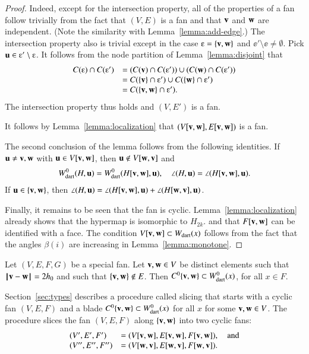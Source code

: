 \begin{proof} 
 Indeed, except for the intersection property, all of the properties of a fan follow trivially from the fact that $(V,E)$ is a fan and
that ${\mathbf v}$ and ${\mathbf w}$ are independent.  (Note the similarity with Lemma~\ref{lemma:add-edge}.)
The intersection property also is trivial except in the case $\ee=\{\v,\w\}$ and $\ee'\setminus \ee\ne \emptyset$.  Pick $\u\in \ee'\setminus\ee$.  It follows from the node
partition of Lemma~\ref{lemma:disjoint} that
$$
\begin{array}{lll}
C(\ee) \cap C(\ee') &= (C(\v) \cap C(\ee')) \cup (C(\w)\cap C(\ee')) \\
 &= C(\{\v\}\cap \ee') \cup C(\{\w\}\cap \ee') \\
 &= C(\{\v,\w\}\cap \ee').
\end{array}
$$
The intersection property thus holds and $(V,E')$ is a fan.

It follows by Lemma~\ref{lemma:localization} that $(V[{\mathbf v},{\mathbf w}],E[{\mathbf v},{\mathbf w}])$ is a fan.

The second conclusion of the lemma follows from the following identities.
If ${\mathbf u}\ne {\mathbf v},{\mathbf w}$ with ${\mathbf u}\in V[{\mathbf v},{\mathbf w}]$, then ${\mathbf u}\not\in V[{\mathbf w},{\mathbf v}]$ and 
\begin{equation}
W^0_{\text{dart}}(H,{\mathbf u})=W^0_{\text{dart}}(H[{\mathbf v},{\mathbf w}],{\mathbf u}),\quad \angle(H,{\mathbf u}) = \angle(H[{\mathbf v},{\mathbf w}],{\mathbf u}).
\end{equation}
If ${\mathbf u}\in\{{\mathbf v},{\mathbf w}\}$, then 
$\angle(H,{\mathbf u})=\angle(H[{\mathbf v},{\mathbf w}],{\mathbf u}) +\angle(H[{\mathbf w},{\mathbf v}],{\mathbf u})$.

Finally, it remains to be seen that the fan is cyclic.  Lemma~\ref{lemma:localization} already shows that the hypermap is isomorphic to $H_{2k}$. and that $F[{\mathbf v},{\mathbf w}]$ can be identified with a face.  The condition $V[{\mathbf v},{\mathbf w}]\subset W_{\text{dart}}(x)$ follows from the fact that the angles $\beta(i)$ are increasing in Lemma~\ref{lemma:monotone}.
\end{proof}


\begin{lemma}\label{lemma:2hm-slice}
Let $(V,E,F,G)$ be a special fan.  Let ${\mathbf v},{\mathbf w}\in V$ be distinct elements such that ${\hskip0.1em|\hskip-0.15em|\hskip0.1em}{\mathbf v} - {\mathbf w}{\hskip0.1em|\hskip-0.15em|\hskip0.1em}=2{h_0}$ and such that $\{{\mathbf v},{\mathbf w}\}\not\in E$.
Then $C^0\{{\mathbf v},{\mathbf w}\}\subset W^0_{\text{dart}}(x)$, for all $x\in F$.
\end{lemma}


Section~\ref{sec:types} describes a procedure called slicing that starts with a cyclic fan $(V,E,F)$
and a blade $C^0\{{\mathbf v},{\mathbf w}\} \subset W^0_{\text{dart}}(x)$ for all $x$ for some ${\mathbf v},{\mathbf w}\in V$.  The procedure slices the fan $(V,E,F)$ along $\{{\mathbf v},{\mathbf w}\}$  into two cyclic fans:
$$
\begin{array}{lll}
(V',E',F')&=(V[{\mathbf v},{\mathbf w}],E[{\mathbf v},{\mathbf w}],F[{\mathbf v},{\mathbf w}]),\quad\text{and}\\
 (V'',E'',F'')&= (V[{\mathbf w},{\mathbf v}],E[{\mathbf w},{\mathbf v}],F[{\mathbf w},{\mathbf v}]).
\end{array}
$$




